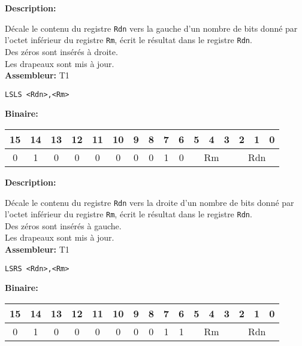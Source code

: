 
\textbf{Description: }

Décale le contenu du registre \texttt{Rdn} vers la gauche d'un nombre de bits donné par l'octet inférieur du registre \texttt{Rm}, écrit le résultat dans le registre \texttt{Rdn}.\\
Des zéros sont insérés à droite.\\
Les drapeaux sont mis à jour.\\

\textbf{Assembleur:} T1

\begin{lstlisting}
LSLS <Rdn>,<Rm>
\end{lstlisting}

\textbf{Binaire:}\\

\begin{tabular}{| c c c c c c c c c c c c c c c c |}
\hline
15 & 14 & 13 & 12 & 11 & 10 & \multicolumn{1}{|c}{9} & 8 & 7 & 6 & \multicolumn{1}{|c}{5} & 4 & 3 & \multicolumn{1}{|c}{2} & 1 & 0 \\
\hline
0 & 1 & 0 & 0 & 0 & 0 & \multicolumn{1}{|c}{0} & 0 & 1 & 0 & \multicolumn{3}{|c}{Rm} & \multicolumn{3}{|c|}{Rdn} \\
\hline
\end{tabular}




\textbf{Description: }

Décale le contenu du registre \texttt{Rdn} vers la droite d'un nombre de bits donné par l'octet inférieur du registre \texttt{Rm}, écrit le résultat dans le registre \texttt{Rdn}.\\
Des zéros sont insérés à gauche.\\
Les drapeaux sont mis à jour.\\

\textbf{Assembleur:} T1

\begin{lstlisting}
LSRS <Rdn>,<Rm>
\end{lstlisting}

\textbf{Binaire:}\\

\begin{tabular}{| c c c c c c c c c c c c c c c c |}
\hline
15 & 14 & 13 & 12 & 11 & 10 & \multicolumn{1}{|c}{9} & 8 & 7 & 6 & \multicolumn{1}{|c}{5} & 4 & 3 & \multicolumn{1}{|c}{2} & 1 & 0 \\
\hline
0 & 1 & 0 & 0 & 0 & 0 & \multicolumn{1}{|c}{0} & 0 & 1 & 1 & \multicolumn{3}{|c}{Rm} & \multicolumn{3}{|c|}{Rdn} \\
\hline
\end{tabular}


